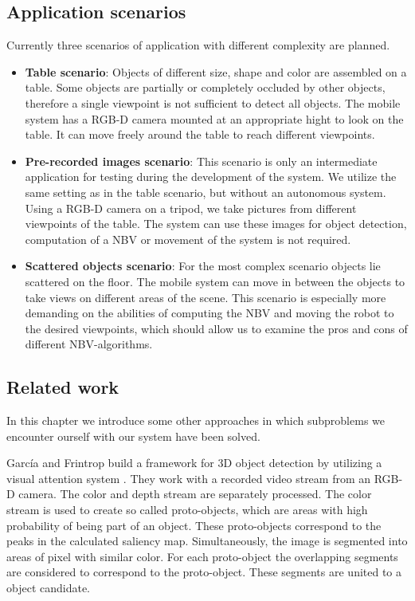 \documentclass[a4paper,11pt,english]{article}
\begin{document}
\subsection{Application scenarios}
Currently three scenarios of application with different complexity are planned.
\begin{itemize}	
	\item \textbf{Table scenario}: Objects of different size, shape and color are assembled on a table. Some objects are partially or completely occluded by other objects, therefore a single viewpoint is not sufficient to detect all objects. The mobile system has a RGB-D camera mounted at an appropriate hight to look on the table. It can move freely around the table to reach different viewpoints.
	\item \textbf{Pre-recorded images scenario}: This scenario is only an intermediate application for testing during the development of the system. We utilize the same setting as in the table scenario, but without an autonomous system. Using a RGB-D camera on a tripod, we take pictures from different viewpoints of the table. The system can use these images for object detection, computation of a NBV or movement of the system is not required.
	\item \textbf{Scattered objects scenario}: For the most complex scenario objects lie scattered on the floor. The mobile system can move in between the objects to take views on different areas of the scene. This scenario is especially more demanding on the abilities of computing the NBV and moving the robot to the desired viewpoints, which should allow us to examine the pros and cons of different NBV-algorithms.
\end{itemize} 

\subsection{Related work}
In this chapter we introduce some other approaches in which subproblems we encounter ourself with our system have been solved.\medskip

García and Frintrop build a framework for 3D object detection by utilizing a visual attention system \cite{garcia2013computational}.
They work with a recorded video stream from an RGB-D camera. The color and depth stream are separately processed. 
The color stream is used to create so called proto-objects, which are areas with high probability of being part of an object. These proto-objects correspond to the peaks in the calculated saliency map. 
Simultaneously, the image is segmented into areas of pixel with similar color. 
For each proto-object the overlapping segments are considered to correspond to the proto-object. These segments are united to a object candidate.
\end{document}
